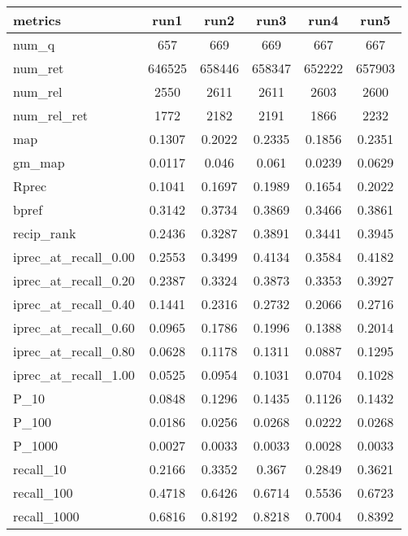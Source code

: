 \begin{table}[h!]
    \centering
    \begin{tabular}{ |l|c|c|c|c|c| } 
        \hline
        metrics & run1 & run2 & run3 & run4 & run5 \\ \hline
        num\_q & 657 & 669 & 669 & 667 & 667 \\ \hline
        num\_ret & 646525 & 658446 & 658347 & 652222 & 657903 \\ \hline
        num\_rel & 2550 & 2611 & 2611 & 2603 & 2600 \\ \hline
        num\_rel\_ret & 1772 & 2182 & 2191 & 1866 & 2232 \\ \hline
        map & 0.1307 & 0.2022 & 0.2335 & 0.1856 & 0.2351 \\ \hline
        gm\_map & 0.0117 & 0.046 & 0.061 & 0.0239 & 0.0629 \\ \hline
        Rprec & 0.1041 & 0.1697 & 0.1989 & 0.1654 & 0.2022 \\ \hline
        bpref & 0.3142 & 0.3734 & 0.3869 & 0.3466 & 0.3861 \\ \hline
        recip\_rank & 0.2436 & 0.3287 & 0.3891 & 0.3441 & 0.3945 \\ \hline
        iprec\_at\_recall\_0.00 & 0.2553 & 0.3499 & 0.4134 & 0.3584 & 0.4182 \\ \hline
        iprec\_at\_recall\_0.20 & 0.2387 & 0.3324 & 0.3873 & 0.3353 & 0.3927 \\ \hline
        iprec\_at\_recall\_0.40 & 0.1441 & 0.2316 & 0.2732 & 0.2066 & 0.2716 \\ \hline
        iprec\_at\_recall\_0.60 & 0.0965 & 0.1786 & 0.1996 & 0.1388 & 0.2014 \\ \hline
        iprec\_at\_recall\_0.80 & 0.0628 & 0.1178 & 0.1311 & 0.0887 & 0.1295 \\ \hline
        iprec\_at\_recall\_1.00 & 0.0525 & 0.0954 & 0.1031 & 0.0704 & 0.1028 \\ \hline
        P\_10 & 0.0848 & 0.1296 & 0.1435 & 0.1126 & 0.1432 \\ \hline
        P\_100 & 0.0186 & 0.0256 & 0.0268 & 0.0222 & 0.0268 \\ \hline
        P\_1000 & 0.0027 & 0.0033 & 0.0033 & 0.0028 & 0.0033 \\ \hline
        recall\_10 & 0.2166 & 0.3352 & 0.367 & 0.2849 & 0.3621 \\ \hline
        recall\_100 & 0.4718 & 0.6426 & 0.6714 & 0.5536 & 0.6723 \\ \hline
        recall\_1000 & 0.6816 & 0.8192 & 0.8218 & 0.7004 & 0.8392 \\ \hline

\end{tabular}
\end{table}
